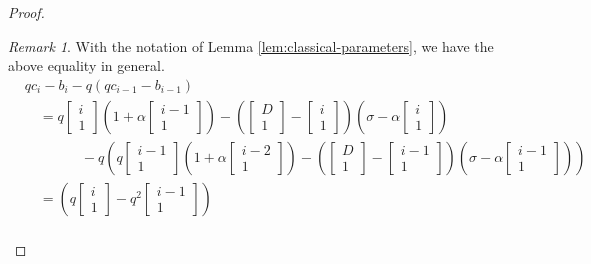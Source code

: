 \documentclass[
]{book}
\theoremstyle{definition}
\theoremstyle{definition}
\theoremstyle{definition}
\theoremstyle{definition}
\theoremstyle{remark}
\newtheorem*{remark}{Remark}
\begin{document}
\begin{proof}
\begin{remark}
With the notation of Lemma \ref{lem:classical-parameters}, we have the above equality in general.
\begin{align}
& qc_i-b_i - q(qc_{i-1}-b_{i-1})\\
& \quad = q\begin{bmatrix}{i}\\{1}\end{bmatrix}\left(1+\alpha \begin{bmatrix}{i-1}\\{1}\end{bmatrix}\right)-\left(\begin{bmatrix}{D}\\{1}\end{bmatrix}-\begin{bmatrix}{i}\\{1}\end{bmatrix}\right)\left(\sigma-\alpha\begin{bmatrix}{i}\\{1}\end{bmatrix}\right)\\
& \qquad\qquad -q\left(q\begin{bmatrix}{i-1}\\{1}\end{bmatrix}\left(1+\alpha\begin{bmatrix}{i-2}\\{1}\end{bmatrix}\right)-\left(\begin{bmatrix}{D}\\{1}\end{bmatrix}-\begin{bmatrix}{i-1}\\{1}\end{bmatrix}\right)\left(\sigma-\alpha\begin{bmatrix}{i-1}\\{1}\end{bmatrix}\right)\right)\\
& \quad = \left(q\begin{bmatrix}{i}\\{1}\end{bmatrix}-q^2\begin{bmatrix}{i-1}\\{1}\end{bmatrix}\right) \\

\end{align}
\end{remark}
\end{proof}
\end{document}
